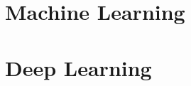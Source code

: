 \documentclass[12pt]{report}
\begin{document}
\chapter{Machine Learning}
\chapter{Deep Learning}
    
        
\end{document}
